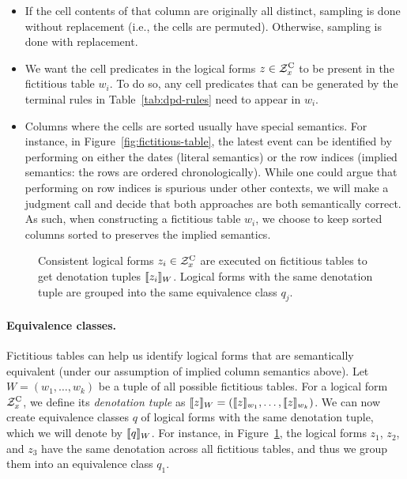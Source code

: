 \begin{itemize}
\item
If the cell contents of that column are originally all distinct,
sampling is done without replacement (i.e., the cells are permuted).
Otherwise, sampling is done with replacement.
\item
We want the cell predicates in the logical forms $z \in \mathcal{Z}^\mathrm{C}_x$
to be present in the fictitious table $w_i$.
To do so, any cell predicates that can be
generated by the terminal rules in Table~\ref{tab:dpd-rules}
need to appear in $w_i$.
\item
Columns where the cells are sorted usually have special semantics.
For instance, in Figure~\ref{fig:fictitious-table},
the latest event can be identified by performing 
on either the dates (literal semantics)
or the row indices (implied semantics: the rows are ordered
chronologically).
While one could argue that performing  on row indices
is spurious
under other contexts,
we will make a judgment call and decide that both approaches
are both semantically correct.
As such, when constructing a fictitious table $w_i$,
we choose to keep sorted columns sorted
to preserves the implied semantics.
\end{itemize}

\begin{figure}[t]
\centering

\caption[Logical forms with the same denotation tuples are grouped into the same equivalence class]{
Consistent logical forms $z_i \in \mathcal{Z}^\mathrm{C}_x$
are executed on fictitious tables to get denotation tuples
$\llbracket{z_i}\rrbracket_{W}$.
Logical forms with the same denotation tuple
are grouped into the same equivalence class $q_j$.}
\label{fig:equivalence-classes}
\end{figure}

\paragraph{Equivalence classes.}
Fictitious tables can help us identify logical forms
that are semantically equivalent
(under our assumption of implied column semantics above).
Let $W = (w_1, \dots, w_k)$ be a tuple of all possible
fictitious tables.
For a logical form $\mathcal{Z}^\mathrm{C}_x$, we define
its \emph{denotation tuple} as
$\llbracket{z}\rrbracket_{W} = (\llbracket{z}\rrbracket_{w_1}, \dots, \llbracket{z}\rrbracket_{w_k})$.
We can now create equivalence classes $q$
of logical forms with the same denotation tuple,
which we will denote by $\llbracket{q}\rrbracket_{W}$. 
For instance, in Figure~\ref{fig:equivalence-classes},
the logical forms $z_1$, $z_2$, and $z_3$ have the same
denotation across all fictitious tables,
and thus we group them into an equivalence class $q_1$.

